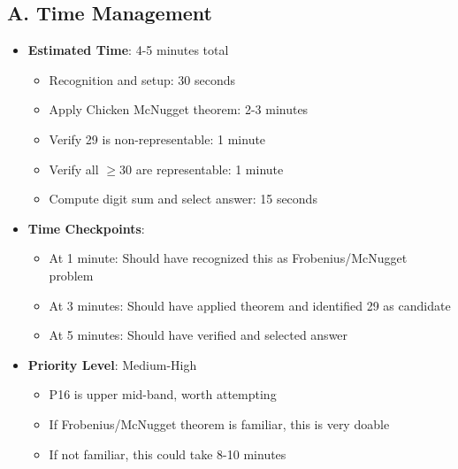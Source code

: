 \documentclass[12pt]{article}
\begin{document}
\begin{competitionbox}
\subsection*{A. Time Management}
\begin{itemize}[leftmargin=*]
    \item \textbf{Estimated Time}: 4-5 minutes total
    \begin{itemize}
        \item Recognition and setup: 30 seconds
        \item Apply Chicken McNugget theorem: 2-3 minutes
        \item Verify 29 is non-representable: 1 minute
        \item Verify all $\geq 30$ are representable: 1 minute
        \item Compute digit sum and select answer: 15 seconds
    \end{itemize}
    \item \textbf{Time Checkpoints}: 
    \begin{itemize}
        \item At 1 minute: Should have recognized this as Frobenius/McNugget problem
        \item At 3 minutes: Should have applied theorem and identified 29 as candidate
        \item At 5 minutes: Should have verified and selected answer
    \end{itemize}
    \item \textbf{Priority Level}: Medium-High
    \begin{itemize}
        \item P16 is upper mid-band, worth attempting
        \item If Frobenius/McNugget theorem is familiar, this is very doable
        \item If not familiar, this could take 8-10 minutes
    \end{itemize}
\end{itemize}


\end{competitionbox}
\end{document}
